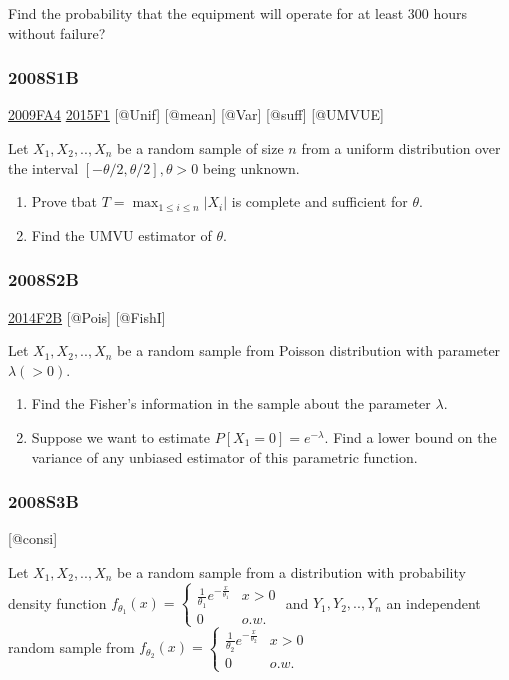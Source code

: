 \documentclass[6pt,Portrait]{article}
\begin{document}
Find the probability that the equipment will operate for at least 300
hours without failure?

\hypertarget{s1b}{%
\subsubsection{2008S1B}\label{s1b}}

\protect\hyperlink{fa4}{2009FA4} \protect\hyperlink{f1-5}{2015F1}
{[}@Unif{]} {[}@mean{]} {[}@Var{]} {[}@suff{]} {[}@UMVUE{]}

Let \(X_1,X_2,..,X_{n}\) be a random sample of size \(n\) from a uniform
distribution over the interval \([-\theta/2,\theta/2], \theta>0\) being
unknown.

\begin{enumerate}
\def\labelenumi{(\alph{enumi})}
\item
  Prove tbat \(T=\max_{1\le i\le n}|X_{i}|\) is complete and sufficient
  for \(\theta\).
\item
  Find the UMVU estimator of \(\theta\).
\end{enumerate}

\hypertarget{s2b}{%
\subsubsection{2008S2B}\label{s2b}}

\protect\hyperlink{f2b-1}{2014F2B} {[}@Pois{]} {[}@FishI{]}

Let \(X_1,X_2,..,X_{n}\) be a random sample from Poisson distribution
with parameter \(\lambda(>0)\).

\begin{enumerate}
\def\labelenumi{(\alph{enumi})}
\item
  Find the Fisher's information in the sample about the parameter
  \(\lambda\).
\item
  Suppose we want to estimate \(P[X_1=0]=e^{-\lambda}\). Find a lower
  bound on the variance of any unbiased estimator of this parametric
  function.
\end{enumerate}

\hypertarget{s3b}{%
\subsubsection{2008S3B}\label{s3b}}

{[}@consi{]}

Let \(X_1,X_2,..,X_{n}\) be a random sample from a distribution with
probability density function
\(f_{\theta_1}(x)=\begin{cases}\frac1{\theta_1} e^{-\frac{x}{\theta_1}}& x>0\\0& o.w.\end{cases}\)
and \(Y_1,Y_2,..,Y_{n}\) an independent random sample from
\(f_{\theta_2}(x)=\begin{cases}\frac1{\theta_2} e^{-\frac{x}{\theta_2}}& x>0\\0& o.w.\end{cases}\)
\end{document}
